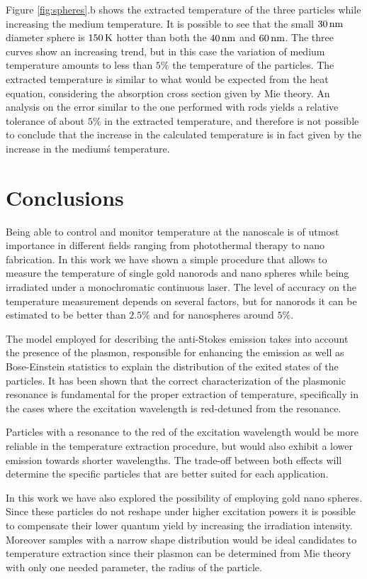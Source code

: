 Figure \ref{fig:spheres}.b shows the extracted temperature of the three
particles while increasing the medium temperature. It is possible to see that
the small $30\,\textrm{nm}$ diameter sphere is $150\,\textrm{K}$ hotter than both the $40\,\textrm{nm}$ and
$60\,\textrm{nm}$. The three curves show an increasing trend, but in this case the
variation of medium temperature amounts to less than $5\%$ the temperature of
the particles. The extracted temperature is similar to what would be expected
from the heat equation, considering the absorption cross section given by Mie
theory. An analysis on the error similar to the one performed with rods yields a
relative tolerance of about $5\%$ in the extracted temperature, and therefore is
not possible to conclude that the increase in the calculated temperature is in
fact given by the increase in the medium\'s temperature.

\section{Conclusions}
Being able to control and monitor temperature at the nanoscale is of utmost
importance in different fields ranging from photothermal therapy\cite{Huang2006}
to nano fabrication\cite{Fedoruk2013}. In this work we have shown a simple
procedure that allows to measure the temperature of single gold nanorods and
nano spheres while being irradiated under a monochromatic continuous laser. The
level of accuracy on the temperature measurement depends on several factors, but
for nanorods it can be estimated to be better than $2.5\%$ and for nanospheres
around $5\%$.

The model employed for describing the anti-Stokes emission takes into account
the presence of the plasmon, responsible for enhancing the emission as well as
Bose-Einstein statistics to explain the distribution of the exited states of the
particles. It has been shown that the correct characterization of the plasmonic
resonance is fundamental for the proper extraction of temperature, specifically
in the cases where the excitation wavelength is red-detuned from the resonance.

Particles with a resonance to the red of the excitation wavelength would be more
reliable in the temperature extraction procedure, but would also exhibit a lower
emission towards shorter wavelengths. The trade-off between both effects will
determine the specific particles that are better suited for each application.

In this work we have also explored the possibility of employing gold nano
spheres. Since these particles do not reshape under higher excitation powers it
is possible to compensate their lower quantum yield by increasing the
irradiation intensity. Moreover samples with a narrow shape distribution would
be ideal candidates to temperature extraction since their plasmon can be
determined from Mie theory with only one needed parameter, the radius of the
particle.

